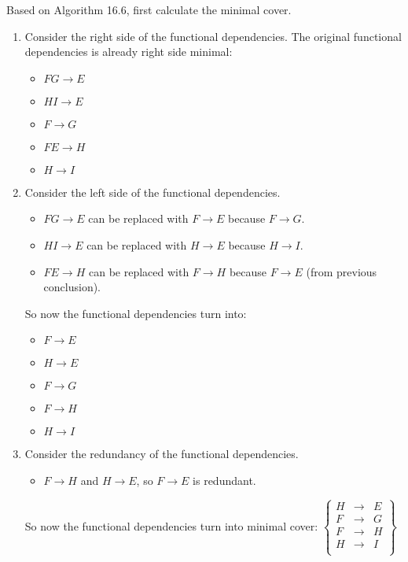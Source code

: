 \documentclass[11pt,letterpaper,titlepage,en-US]{article}
\begin{document}
\pagebreak
\begin{homeworkProblem}
Based on Algorithm 16.6, first calculate the minimal cover.
    \begin{enumerate}[label=\textbf{Step {\arabic*}}, leftmargin=2cm]
        \item Consider the right side of the functional dependencies.
            The original functional dependencies is already right side minimal:
            \begin{itemize}
                \item $FG \rightarrow E$
                \item $HI \rightarrow E$
                \item $F \rightarrow G$
                \item $FE \rightarrow H$
                \item $H \rightarrow I$
            \end{itemize}
        \item Consider the left side of the functional dependencies.
            \begin{itemize}
                \item $FG \rightarrow E$ can be replaced with $F \rightarrow E$ because $F \rightarrow G$.
                \item $HI \rightarrow E$ can be replaced with $H \rightarrow E$ because $H \rightarrow I$.
                \item $FE \rightarrow H$ can be replaced with $F \rightarrow H$ because $F \rightarrow E$ (from previous conclusion).
            \end{itemize}
            So now the functional dependencies turn into:
            \begin{itemize}
                \item $F \rightarrow E$
                \item $H \rightarrow E$
                \item $F \rightarrow G$
                \item $F \rightarrow H$
                \item $H \rightarrow I$
            \end{itemize}
        \item Consider the redundancy of the functional dependencies.
            \begin{itemize}
                \item $F \rightarrow H$ and $H \rightarrow E$, so $F \rightarrow E$ is redundant.
            \end{itemize}
            So now the functional dependencies turn into minimal cover:
            $\displaystyle\left\{
                    \begin{array}{rcl}
                        H &\rightarrow& E \\
                        F &\rightarrow& G \\
                        F &\rightarrow& H \\
                        H &\rightarrow& I \\
                    \end{array}
            \right\}$


\end{enumerate}
\end{homeworkProblem}
\end{document}
